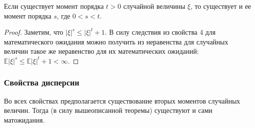 \begin{thm*}
    Если существует момент порядка $t > 0$ случайной величины $\xi$, то существует и ее момент порядка $s$, где $0 < s < t$.
\end{thm*}

\begin{proof} 
Заметим, что $|\xi|^s \leqslant |\xi|^t + 1.$ 
В силу следствия из свойства 4 для математического ожидания можно получить из неравенства для случайных величин такое же неравенство для их математических ожиданий: $\mathbb{E}|\xi|^s \leqslant \mathbb{E}|\xi|^t + 1 < \infty.$
\end{proof}

\subsubsection{Свойства дисперсии}

\begin{rmrk}
    Во всех свойствах предполагается существование вторых моментов случайных величин. 
    Тогда (в силу вышеописанной теоремы) существуют и сами матожидания.
\end{rmrk} 


